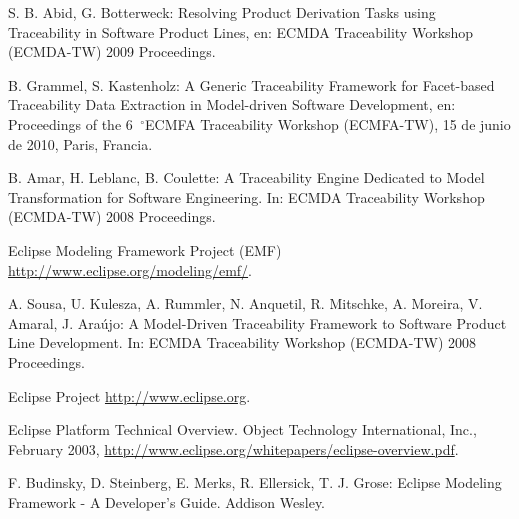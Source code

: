 \documentclass[a4paper,12pt,oneside]{book}
\newcommand{\grad}{\hspace{-2mm}$\phantom{a}^{\circ}$}
\begin{document}
\begin{thebibliography}{99}
 S. B. Abid, G. Botterweck: Resolving Product Derivation Tasks using Traceability in Software Product Lines, en: ECMDA Traceability Workshop (ECMDA-TW) 2009 Proceedings.

 B. Grammel, S. Kastenholz: A Generic Traceability Framework for Facet-based Traceability Data Extraction in Model-driven Software Development, en: Proceedings of the 6\grad ECMFA Traceability Workshop (ECMFA-TW), 15 de junio de 2010, Paris, Francia.

 B. Amar, H. Leblanc, B. Coulette: A Traceability Engine Dedicated to Model Transformation for Software Engineering. In: ECMDA Traceability Workshop (ECMDA-TW) 2008 Proceedings.

 Eclipse Modeling Framework Project (EMF) \url{http://www.eclipse.org/modeling/emf/}.

 A. Sousa, U. Kulesza, A. Rummler, N. Anquetil, R. Mitschke, A. Moreira, V. Amaral, J. Araújo: A Model-Driven Traceability Framework to Software Product Line Development. In: ECMDA Traceability Workshop (ECMDA-TW) 2008 Proceedings.

 Eclipse Project \url{http://www.eclipse.org}.

 Eclipse Platform Technical Overview. Object Technology International, Inc., February 2003,
\url{http://www.eclipse.org/whitepapers/eclipse-overview.pdf}.

 F. Budinsky, D. Steinberg, E. Merks, R. Ellersick, T. J. Grose: Eclipse Modeling Framework - A Developer's Guide. Addison Wesley.

\end{thebibliography}
\end{document}
